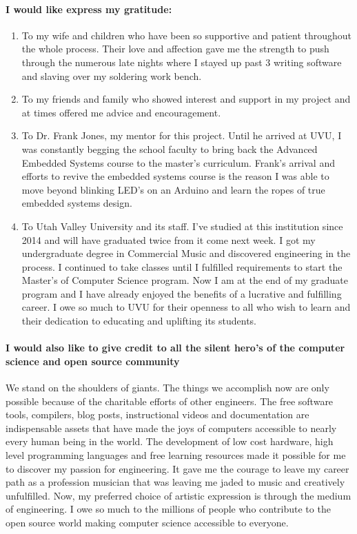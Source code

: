 \documentclass[acmlarge,screen]{acmart}
\begin{document}
	\paragraph{I would like express my gratitude:}
	\begin{enumerate}
		\item To my wife and children who have been so supportive and patient throughout the whole process. Their love and affection gave me the strength to push through the numerous late nights where I stayed up past 3 writing software and slaving over my soldering work bench.
		\item To my friends and family who showed interest and support in my project and at times offered me advice and encouragement.
		\item To Dr. Frank Jones, my mentor for this project. Until he arrived at UVU, I was constantly begging the school faculty to bring back the Advanced Embedded Systems course to the master's curriculum. Frank's arrival and efforts to revive the embedded systems course is the reason I was able to move beyond blinking LED's on an Arduino and learn the ropes of true embedded systems design.
		\item To Utah Valley University and its staff. I've studied at this institution since 2014 and will have graduated twice from it come next week. I got my undergraduate degree in Commercial Music and discovered engineering in the process. I continued to take classes until I fulfilled requirements to start the Master's of Computer Science program. Now I am at the end of my graduate program and I have already enjoyed the benefits of a lucrative and fulfilling career. I owe so much to UVU for their openness to all who wish to learn and their dedication to educating and uplifting its students.
	\end{enumerate}

	\paragraph{I would also like to give credit to all the silent hero's of the computer science and open source community} We stand on the shoulders of giants. The things we accomplish now are only possible because of the charitable efforts of other engineers. The free software tools, compilers, blog posts, instructional videos and documentation are indispensable assets that have made the joys of computers accessible to nearly every human being in the world. The development of low cost hardware, high level programming languages and free learning resources made it possible for me to discover my passion for engineering. It gave me the courage to leave my career path as a profession musician that was leaving me jaded to music and creatively unfulfilled. Now, my preferred choice of artistic expression is through the medium of engineering. I owe so much to the millions of people who contribute to the open source world making computer science accessible to everyone.
\end{document}
